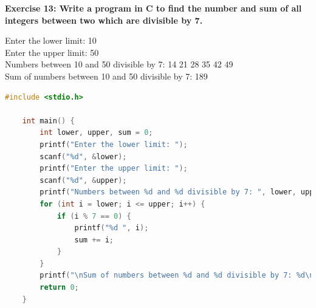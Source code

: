 \documentclass[12pt, openany]{book}
\begin{document}
\noindent\textbf{Exercise 13: Write a program in C to find the number and sum of all integers between two which are divisible by 7.}
\begin{tcolorbox}[colback=lightgray!10, colframe=black, title=Example Output]
    Enter the lower limit: 10 \\
    Enter the upper limit: 50 \\
    Numbers between 10 and 50 divisible by 7: 14 21 28 35 42 49 \\
    Sum of numbers between 10 and 50 divisible by 7: 189
\end{tcolorbox}

\begin{lstlisting}[language=C, gobble=0, caption=Solution to Exercise 13]
    #include <stdio.h>
    
    int main() {
        int lower, upper, sum = 0;
        printf("Enter the lower limit: ");
        scanf("%d", &lower);
        printf("Enter the upper limit: ");
        scanf("%d", &upper);
        printf("Numbers between %d and %d divisible by 7: ", lower, upper);
        for (int i = lower; i <= upper; i++) {
            if (i % 7 == 0) {
                printf("%d ", i);
                sum += i;
            }
        }
        printf("\nSum of numbers between %d and %d divisible by 7: %d\n", lower, upper, sum);
        return 0;
    }
\end{lstlisting}
\end{document}
